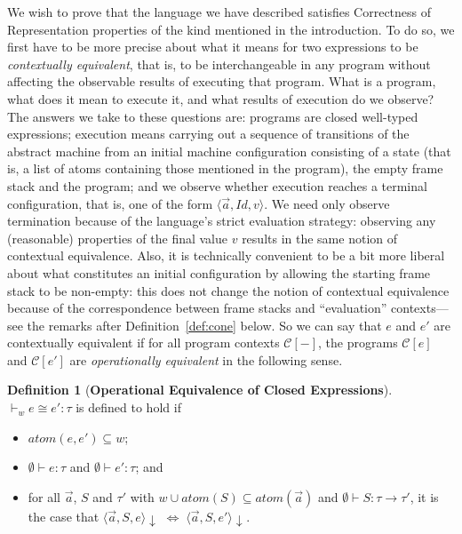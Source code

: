 \documentclass{LMCS}
\theoremstyle{plain}
\theoremstyle{definition}
\newtheorem{definition}[thm]{Definition}
\newcommand{\atoms}{\mathit{atom}}
\newcommand{\bimp}{\Leftrightarrow}
\newcommand{\config}[3]{\langle#1, #2, #3\rangle}
\newcommand{\ent}{\vdash}
\newcommand{\enty}{\vdash}
\newcommand{\es}{\mathit{Id}}
\renewcommand{\exp}[1][e]{#1}
\newcommand{\FUNTY}{\mathbin{\rightarrow}}
\newcommand{\ofty}{:}
\newcommand{\opeq}{\cong}
\newcommand{\s}[1][a]{\vec{#1}}
\newcommand{\stk}[1][S]{#1}
\newcommand{\terminates}[1][]{{\downarrow_{#1}}}
\newcommand{\ty}{\tau}
\newcommand{\val}[1][v]{#1}
\newcommand{\w}[1][w]{#1}
\begin{document}
We wish to prove that the language we have described satisfies
Correctness of Representation properties of the kind mentioned in the
introduction. To do so, we first have to be more precise about what it
means for two expressions to be \emph{contextually equivalent}, that
is, to be interchangeable in any program without affecting the
observable results of executing that program. What is a program, what
does it mean to execute it, and what results of execution do we
observe? The answers we take to these questions are: programs are
closed well-typed expressions; execution means carrying out a sequence
of transitions of the abstract machine from an initial machine
configuration consisting of a state (that is, a list of atoms
containing those mentioned in the program), the empty frame stack and
the program; and we observe whether execution reaches a terminal
configuration, that is, one of the form $\config{\s}{\es}{\val}$. We
need only observe termination because of the language's strict
evaluation strategy: observing any (reasonable) properties of the
final value $\val$ results in the same notion of contextual
equivalence. Also, it is technically convenient to be a bit more
liberal about what constitutes an initial configuration by allowing
the starting frame stack to be non-empty: this does not change the
notion of contextual equivalence because of the correspondence between
frame stacks and ``evaluation'' contexts---see the remarks after
Definition~\ref{def:cone} below.  So we can say that $\exp$ and
$\exp'$ are contextually equivalent if for all program contexts
$\mathcal{C}[-]$, the programs $\mathcal{C}[\exp]$ and
$\mathcal{C}[\exp']$ are \emph{operationally equivalent} in the
following sense.

\begin{definition}[\textbf{Operational Equivalence of Closed Expressions}]
  \label{def:opee}
  ${}\ent_{\w} \exp \opeq \exp' \ofty\ty$ is defined to hold if
  \begin{itemize}

  \item $\atoms(e,e')\subseteq\w$;

  \item $\emptyset\enty\exp\ofty\ty$ and
    $\emptyset\enty\exp'\ofty\ty$; and
    
  \item for all $\s$, $\stk$ and $\ty'$ with
    $\w\cup\atoms(\stk)\subseteq\atoms(\s)$ and
    $\emptyset\enty\stk\ofty\ty\FUNTY\ty'$, it is the case that
    $\config{\s}{\stk}{\exp}\terminates \;\bimp\;
    \config{\s}{\stk}{\exp'}\terminates$.
  \end{itemize}
\end{definition}
\end{document}
